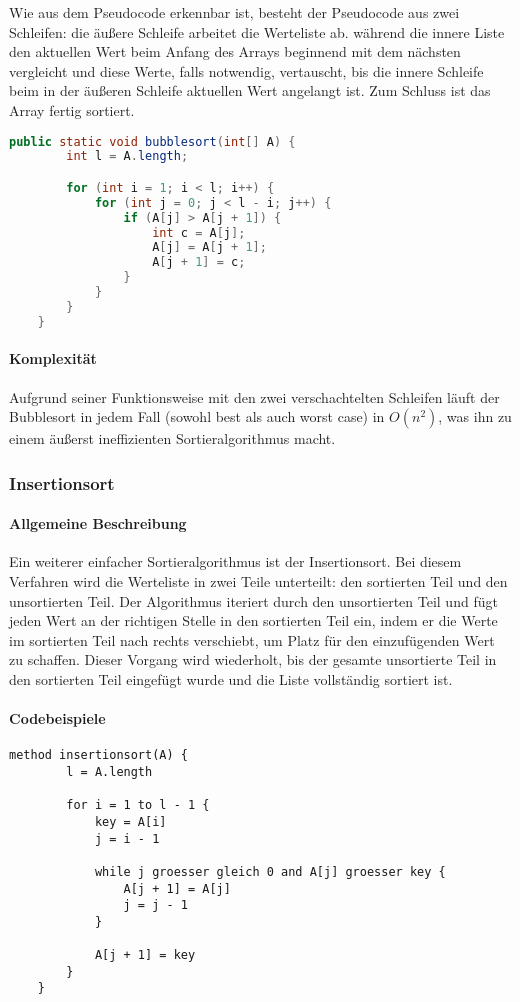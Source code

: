 \documentclass{article}
\begin{document}
	Wie aus dem Pseudocode erkennbar ist, besteht der Pseudocode aus zwei Schleifen: die äußere Schleife arbeitet die Werteliste ab. während die innere Liste den aktuellen Wert beim Anfang des Arrays beginnend mit dem nächsten vergleicht und diese Werte, falls notwendig, vertauscht, bis die innere Schleife beim in der äußeren Schleife aktuellen Wert angelangt ist. Zum Schluss ist das Array fertig sortiert.

	
	\begin{lstlisting}[language=Java, caption=Der Bubblesort-Algorithmus in Java]
	public static void bubblesort(int[] A) {
		int l = A.length;

		for (int i = 1; i < l; i++) {
			for (int j = 0; j < l - i; j++) {
				if (A[j] > A[j + 1]) {
					int c = A[j];
					A[j] = A[j + 1];
					A[j + 1] = c;
				}
			}
		}
	}
	\end{lstlisting}

	\paragraph{Komplexität}
	Aufgrund seiner Funktionsweise mit den zwei verschachtelten Schleifen läuft der Bubblesort in jedem Fall (sowohl best als auch worst case) in \textbf{$O(n^2)$}, was ihn zu einem äußerst ineffizienten Sortieralgorithmus macht.

	\subsubsection{Insertionsort}
	\paragraph{Allgemeine Beschreibung}
	Ein weiterer einfacher Sortieralgorithmus ist der Insertionsort. Bei diesem Verfahren wird die Werteliste in zwei Teile unterteilt: den sortierten Teil und den unsortierten Teil. Der Algorithmus iteriert durch den unsortierten Teil und fügt jeden Wert an der richtigen Stelle in den sortierten Teil ein, indem er die Werte im sortierten Teil nach rechts verschiebt, um Platz für den einzufügenden Wert zu schaffen. Dieser Vorgang wird wiederholt, bis der gesamte unsortierte Teil in den sortierten Teil eingefügt wurde und die Liste vollständig sortiert ist.

	\paragraph{Codebeispiele}
	\begin{lstlisting}[caption=Der Insertionsort-Algorithmus in einfachem Pseudocode]
	method insertionsort(A) {
		l = A.length

		for i = 1 to l - 1 {
			key = A[i]
			j = i - 1

			while j groesser gleich 0 and A[j] groesser key {
				A[j + 1] = A[j]
				j = j - 1
			}

			A[j + 1] = key
		}
	}
	\end{lstlisting}
\end{document}
